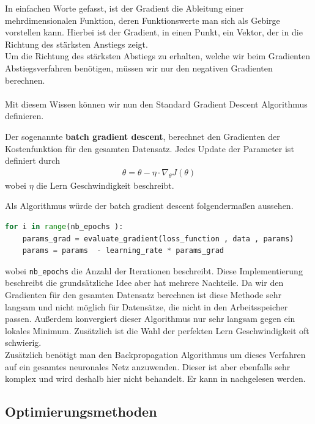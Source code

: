In einfachen Worte gefasst, ist der Gradient die Ableitung einer mehrdimensionalen
Funktion, deren Funktionswerte man sich als Gebirge vorstellen kann.
Hierbei ist der Gradient, in einen Punkt, ein Vektor, der in die Richtung des 
stärksten Anstiegs zeigt. \\
Um die Richtung des stärksten Abstiegs zu erhalten, welche wir beim Gradienten
Abstiegsverfahren benötigen, müssen wir nur den negativen Gradienten berechnen. \\\\
Mit diesem Wissen können wir nun den Standard Gradient Descent Algorithmus definieren.

\begin{definition}
    \cite[Kapitel 2.1]{Ruder.9152016}
    Der sogenannte \textbf{batch gradient descent}, berechnet den Gradienten der 
    Kostenfunktion für den gesamten Datensatz. Jedes Update der Parameter ist definiert durch
    \begin{align}
        \theta = \theta - \eta \cdot \nabla_\theta J(\theta)
    \end{align}
    wobei $\eta$ die Lern Geschwindigkeit beschreibt.
\end{definition}


Als Algorithmus würde der batch gradient descent folgendermaßen aussehen.

\begin{lstlisting}[language=Python]
for i in range(nb_epochs ):
    params_grad = evaluate_gradient(loss_function , data , params)
    params = params  - learning_rate * params_grad
\end{lstlisting}

wobei \texttt{nb\_epochs} die Anzahl der Iterationen beschreibt. 
Diese Implementierung beschreibt die grundsätzliche Idee aber hat mehrere 
Nachteile. Da wir den Gradienten für den gesamten Datensatz berechnen ist 
diese Methode sehr langsam und nicht möglich für Datensätze, die nicht in den 
Arbeitsspeicher passen. Außerdem konvergiert dieser Algorithmus nur sehr langsam gegen
ein lokales Minimum. Zusätzlich ist die Wahl der perfekten Lern Geschwindigkeit oft
schwierig. \\

Zusätzlich benötigt man den Backpropagation Algorithmus um dieses Verfahren auf
ein gesamtes neuronales Netz anzuwenden. Dieser ist aber ebenfalls sehr komplex
und wird deshalb hier nicht behandelt. Er kann in \cite[Kapitel 2]{MichaelNielsen.Juni2019}
nachgelesen werden.

\subsection{Optimierungsmethoden}\label{Optimierungsmethoden}

